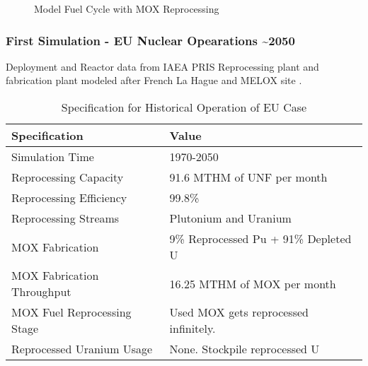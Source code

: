 \begin{frame}
\begin{figure}
\begin{adjustbox}{max totalsize={1.1\textwidth}{.8\textheight}, center}
                \end{adjustbox}
                
                \caption{Model Fuel Cycle with \gls{MOX} Reprocessing}
                \label{diag:fc}
\end{figure}
\end{frame}

\begin{frame}
	\frametitle{First Simulation - EU Nuclear Opearations \textasciitilde 2050}
	Deployment and Reactor data from IAEA PRIS
	Reprocessing plant and fabrication plant modeled after French La Hague and MELOX site
	\cite{schneider_spent_2008, hugelmann_melox_1999}.
		
\begin{table}[h]
	\centering
	\begin{tabularx}{\textwidth}{bb}
		\hline
		Specification & Value \\
		\hline
		Simulation Time & 1970-2050 \\ 
		Reprocessing Capacity & 91.6 MTHM of \gls{UNF} per month \cite{schneider_spent_2008} \\
		Reprocessing Efficiency & 99.8\% \\
		Reprocessing Streams & Plutonium and Uranium \\
		\gls{MOX} Fabrication & \small{9\% Reprocessed Pu + 91\% Depleted U} \\
		\gls{MOX} Fabrication Throughput & 16.25 MTHM of \gls{MOX} per month  \cite{hugelmann_melox_1999} \\
		\gls{MOX} Fuel Reprocessing Stage &  Used \gls{MOX} gets reprocessed infinitely. \\  
		Reprocessed Uranium Usage &  None. Stockpile reprocessed U \\
		\hline
	\end{tabularx}
	\caption {Specification for Historical Operation of \gls{EU} Case}
	\label{tab:sim_eu}
\end{table}
	
\end{frame}

